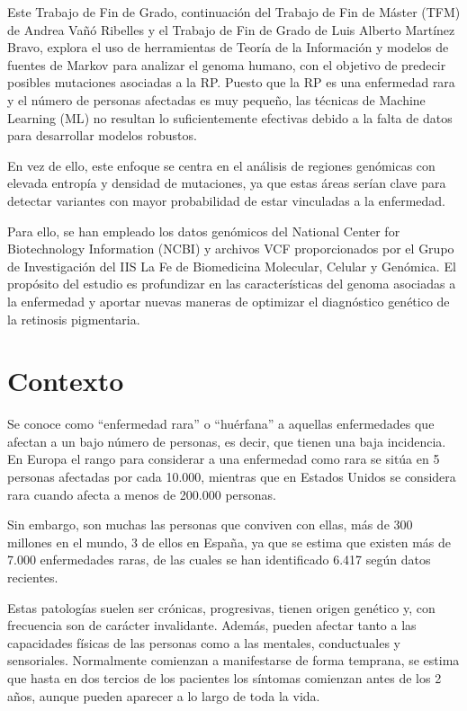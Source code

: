 \documentclass[11pt,spanish,listoffigures,listoftables]{tfgetsinf}
\begin{document}
Este Trabajo de Fin de Grado, continuación del Trabajo de Fin de Máster (TFM) de Andrea Vañó Ribelles y el Trabajo de Fin de Grado de Luis Alberto Martínez Bravo, explora el uso de herramientas de Teoría de la Información y modelos de fuentes de Markov para analizar el genoma humano, con el objetivo de predecir posibles mutaciones asociadas a la \ac{RP}. Puesto que la \ac{RP} es una enfermedad rara y el número de personas afectadas es muy pequeño, las técnicas de Machine Learning (\ac{ML}) no resultan lo suficientemente efectivas debido a la falta de datos para desarrollar modelos robustos. 

 

En vez de ello, este enfoque se centra en el análisis de regiones genómicas con elevada entropía y densidad de mutaciones, ya que estas áreas serían clave para detectar variantes con mayor probabilidad de estar vinculadas a la enfermedad. 

 

Para ello, se han empleado los datos genómicos del National Center for Biotechnology Information (NCBI) y archivos \ac{VCF} proporcionados por el Grupo de Investigación del \ac{IIS} La Fe de Biomedicina Molecular, Celular y Genómica. El propósito del estudio es profundizar en las características del genoma asociadas a la enfermedad y aportar nuevas maneras de optimizar el diagnóstico genético de la retinosis pigmentaria. 

\section{Contexto}

Se conoce como “enfermedad rara” o “huérfana” a aquellas enfermedades que afectan a un bajo número de personas, es decir, que tienen una baja incidencia. En Europa el rango para considerar a una enfermedad como rara se sitúa en 5 personas afectadas por cada 10.000, mientras que en Estados Unidos se considera rara cuando afecta a menos de 200.000 personas\cite{ENF}.

Sin embargo, son muchas las personas que conviven con ellas, más de 300 millones en el mundo, 3 de ellos en España, ya que se estima que existen más de 7.000 enfermedades raras, de las cuales se han identificado 6.417 según datos recientes\cite{CON}.

Estas patologías suelen ser crónicas, progresivas, tienen origen genético y, con frecuencia son de carácter invalidante. Además, pueden afectar tanto a las capacidades físicas de las personas como a las mentales, conductuales y sensoriales. Normalmente comienzan a manifestarse de forma temprana, se estima que hasta en dos tercios de los pacientes los síntomas comienzan antes de los 2 años, aunque pueden aparecer a lo largo de toda la vida. 
\end{document}
